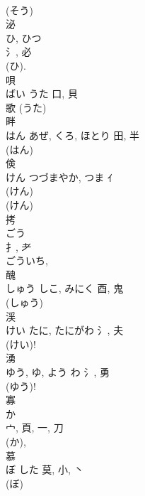 \documentclass[8pt]{extreport}
\begin{document}
\begin{CJK}{UTF8}{min}
\\	(そう) 
\\	泌	
\\	ひ, ひつ	
\\	氵, 必	
\\	(ひ). 
\\	唄	
\\	ばい	うた	口, 貝	
\\	歌 (うた) 
\\	畔	
\\	はん	あぜ, くろ, ほとり	田, 半	
\\	(はん) 
\\	倹	
\\	けん	つづまやか, つま	ｲ		
\\	(けん) 
\\	(けん) 
\\	拷	
\\	ごう	
\\	扌, 耂		
\\	ごういち, 
\\	醜	
\\	しゅう	しこ, みにく	酉, 鬼	
\\	(しゅう) 
\\	渓	
\\	けい	たに, たにがわ	氵, 夫		
\\	(けい)! 
\\	湧	
\\	ゆう, ゆ, よう	わ	氵, 勇	
\\	(ゆう)! 
\\	寡	
\\	か	
\\	宀, 頁, 一, 刀	
\\	(か), 
\\	慕	
\\	ぼ	した	莫, 小, 丶	
\\	(ぼ) 
\end{CJK}
\end{document}
